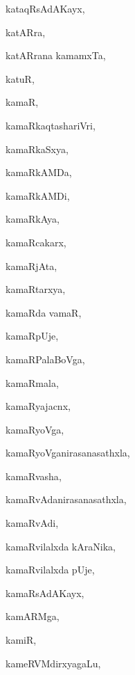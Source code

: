 \begin{multicols}{3}
{\noindent
{kataqRsAdAKayx}, \pageref{kataqRsAdAKayx}

\noindent
{katARra}, \pageref{katARra}

\noindent
{katARrana kamamxTa}, \pageref{katARrana kamamxTa}

\noindent
{katuR}, \pageref{katuR}

\noindent
{kamaR}, \pageref{kamaR}

\noindent
{kamaRkaqtashariVri}, \pageref{kamaRkaqtashariVri}

\noindent
{kamaRkaSxya}, \pageref{kamaRkaSxya}

\noindent
{kamaRkAMDa}, \pageref{kamaRkAMDa}

\noindent
{kamaRkAMDi}, \pageref{kamaRkAMDi}

\noindent
{kamaRkAya}, \pageref{kamaRkAya}

\noindent
{kamaRcakarx}, \pageref{kamaRcakarx}

\noindent
{kamaRjAta}, \pageref{kamaRjAta}

\noindent
{kamaRtarxya}, \pageref{kamaRtarxya}

\noindent
{kamaRda vamaR}, \pageref{kamaRda vamaR}

\noindent
{kamaRpUje}, \pageref{kamaRpUje}

\noindent
{kamaRPalaBoVga}, \pageref{kamaRPalaBoVga}

\noindent
{kamaRmala}, \pageref{kamaRmala}

\noindent
{kamaRyajacnx}, \pageref{kamaRyajacnx}

\noindent
{kamaRyoVga}, \pageref{kamaRyoVga}

\noindent
{kamaRyoVganirasanasathxla}, \pageref{kamaRyoVganirasanasathxla}

\noindent
{kamaRvasha}, \pageref{kamaRvasha}

\noindent
{kamaRvAdanirasanasathxla}, \pageref{kamaRvAdanirasanasathxla}

\noindent
{kamaRvAdi}, \pageref{kamaRvAdi}

\noindent
{kamaRvilalxda kAraNika}, \pageref{kamaRvilalxda kAraNika}

\noindent
{kamaRvilalxda pUje}, \pageref{kamaRvilalxda pUje}

\noindent
{kamaRsAdAKayx}, \pageref{kamaRsAdAKayx}

\noindent
{kamARMga}, \pageref{kamARMga}

\noindent
{kamiR}, \pageref{kamiR}

\noindent
{kameRVMdirxyagaLu}, \pageref{kameRVMdirxyagaLu}

}
\end{multicols}
